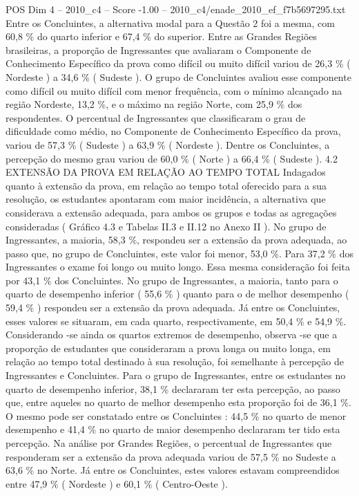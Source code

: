 \begin{textsample}{POS Dim 4 – 2010\_c4 – Score -1.00 – 2010\_c4/enade\_2010\_ef\_f7b5697295.txt}
Entre os Concluintes, a alternativa modal para a Questão 2 foi a mesma, com 60,8 \% do quarto inferior e 67,4 \% do superior.
Entre as Grandes Regiões brasileiras, a proporção de Ingressantes que avaliaram o Componente de Conhecimento Específico da prova como difícil ou muito difícil variou de 26,3 \% ( Nordeste ) a 34,6 \% ( Sudeste ).
O grupo de Concluintes avaliou esse componente como difícil ou muito difícil com menor frequência, com o mínimo alcançado na região Nordeste, 13,2 \%, e o máximo na região Norte, com 25,9 \% dos respondentes.
O percentual de Ingressantes que classificaram o grau de dificuldade como médio, no Componente de Conhecimento Específico da prova, variou de 57,3 \% ( Sudeste ) a 63,9 \% ( Nordeste ).
Dentre os Concluintes, a percepção do mesmo grau variou de 60,0 \% ( Norte ) a 66,4 \% ( Sudeste ). 4.2 EXTENSÃO DA PROVA EM RELAÇÃO AO TEMPO TOTAL Indagados quanto à extensão da prova, em relação ao tempo total oferecido para a sua resolução, os estudantes apontaram com maior incidência, a alternativa que considerava a extensão adequada, para ambos os grupos e todas as agregações consideradas ( Gráfico 4.3 e Tabelas II.3 e II.12 no Anexo II ).
No grupo de Ingressantes, a maioria, 58,3 \%, respondeu ser a extensão da prova adequada, ao passo que, no grupo de Concluintes, este valor foi menor, 53,0 \%.
Para 37,2 \% dos Ingressantes o exame foi longo ou muito longo.
Essa mesma consideração foi feita por 43,1 \% dos Concluintes.
No grupo de Ingressantes, a maioria, tanto para o quarto de desempenho inferior ( 55,6 \% ) quanto para o de melhor desempenho ( 59,4 \% ) respondeu ser a extensão da prova adequada.
Já entre os Concluintes, esses valores se situaram, em cada quarto, respectivamente, em 50,4 \% e 54,9 \%.
Considerando -se ainda os quartos extremos de desempenho, observa -se que a proporção de estudantes que consideraram a prova longa ou muito longa, em relação ao tempo total destinado à sua resolução, foi semelhante à percepção de Ingressantes e Concluintes.
Para o grupo de Ingressantes, entre os estudantes no quarto de desempenho inferior, 38,1 \% declararam ter esta percepção, ao passo que, entre aqueles no quarto de melhor desempenho esta proporção foi de 36,1 \%.
O mesmo pode ser constatado entre os Concluintes : 44,5 \% no quarto de menor desempenho e 41,4 \% no quarto de maior desempenho declararam ter tido esta percepção.
Na análise por Grandes Regiões, o percentual de Ingressantes que responderam ser a extensão da prova adequada variou de 57,5 \% no Sudeste a 63,6 \% no Norte.
Já entre os Concluintes, estes valores estavam compreendidos entre 47,9 \% ( Nordeste ) e 60,1 \% ( Centro-Oeste ).

\end{textsample}
